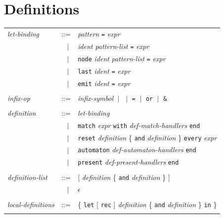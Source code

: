 \documentclass[11pt,titlepage,twoside]{report}
\newcommand{\alt}{\;|\;}
\newcommand{\Let}{\mbox{{\tt let}}}
\newcommand{\Rec}{\mbox{{\tt rec}}}
\newcommand{\In}{\mbox{{\tt in}}}
\newcommand{\And}{\mbox{{\tt and}}}
\newcommand{\Reset}{\mbox{{\tt reset}}}
\newcommand{\Every}{\mbox{{\tt every}}}
\newcommand{\term}[1]{{\tt #1}}
\newcommand{\nterm}[1]{{\em #1}}
\begin{document}
\section{Definitions}
\label{definitions}
\begin{center}
\begin{tabular}{lcl}
\nterm{let-binding}
   & ::=        & \nterm{pattern} \term{=} \nterm{expr} \\
   & $\;\;\alt$ & \nterm{ident} \nterm{pattern-list} \term{=} \nterm{expr} \\
   & $\;\;\alt$ & \term{node} \nterm{ident} \nterm{pattern-list} 
                  \term{=} \nterm{expr} \\
   & $\;\;\alt$ & \term{last} \nterm{ident} \term{=} \nterm{expr} \\
   & $\;\;\alt$ & \term{emit} \nterm{ident} \term{=} \nterm{expr}
\\ \\
\nterm{infix-op}                
   & ::=        & \nterm{infix-symbol} 
                  $\alt$ \term{*} 
                  $\alt$ \term{=} 
                  $\alt$ \term{or}  
                  $\alt$ \term{\&}
\\ \\
\nterm{definition} 
   & ::=        & \nterm{let-binding} \\
   & $\;\;\alt$ & \term{match} \nterm{expr} \term{with}  
                  \nterm{def-match-handlers} \term{end} \\
   & $\;\;\alt$ & \term{\Reset} \nterm{definition} 
                  \{ \term{\And} \nterm{definition} \}
                  \term{\Every} \nterm{expr} \\
   & $\;\;\alt$ & \term{automaton} \nterm{def-automaton-handlers}
                  \term{end} \\
   & $\;\;\alt$ & \term{present} \nterm{def-present-handlers} \term{end}
\\ \\
\nterm{definition-list}
   & ::=        & [ \nterm{definition} \{ \term{\And}
                  \nterm{definition} \} ] \\ 
   & $\;\;\alt$ & $\epsilon$
\\ \\
\nterm{local-definitions}      
   & ::=        & \{ \term{\Let} [ \term{\Rec} ] \nterm{definition}
                  \{ \term{\And} \nterm{definition} \} \term{\In} \}
\\ \\

\end{tabular}
\end{center}
\end{document}
